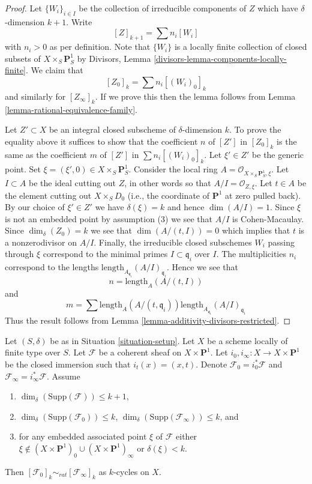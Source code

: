 \begin{proof}
Let $\{W_i\}_{i \in I}$ be the collection of irreducible
components of $Z$ which have $\delta$-dimension $k + 1$.
Write
$$
[Z]_{k + 1} = \sum n_i[W_i]
$$
with $n_i > 0$ as per definition. Note that $\{W_i\}$
is a locally finite collection of closed subsets of
$X \times_S \mathbf{P}^1_S$ by
Divisors, Lemma \ref{divisors-lemma-components-locally-finite}.
We claim that
$$
[Z_0]_k = \sum n_i[(W_i)_0]_k
$$
and similarly for $[Z_\infty]_k$. If we prove this then the lemma
follows from Lemma \ref{lemma-rational-equivalence-family}.

\medskip\noindent
Let $Z' \subset X$ be an integral closed subscheme of $\delta$-dimension $k$.
To prove the equality above it suffices to show that the coefficient $n$
of $[Z']$ in $[Z_0]_k$ is the same as the coefficient $m$ of
$[Z']$ in $\sum n_i[(W_i)_0]_k$. Let $\xi' \in Z'$ be the generic point.
Set $\xi = (\xi', 0) \in  X \times_S \mathbf{P}^1_S$.
Consider the local ring $A = \mathcal{O}_{X \times_S \mathbf{P}^1_S, \xi}$.
Let $I \subset A$ be the ideal cutting out $Z$, in other words so that
$A/I = \mathcal{O}_{Z, \xi}$. Let $t \in A$ be the element cutting
out $X \times_S D_0$ (i.e., the coordinate of $\mathbf{P}^1$ at zero
pulled back). By our choice of $\xi' \in Z'$ we have $\delta(\xi) = k$
and hence $\dim(A/I) = 1$. Since $\xi$ is not an embedded point by
assumption (3) we see that $A/I$ is Cohen-Macaulay. Since $\dim_\delta(Z_0)
= k$ we see that $\dim(A/(t, I)) = 0$ which implies that $t$
is a nonzerodivisor on $A/I$. Finally, the irreducible closed subschemes
$W_i$ passing through $\xi$ correspond to the minimal primes
$I \subset \mathfrak q_i$ over $I$. The multiplicities $n_i$ correspond
to the lengths $\text{length}_{A_{\mathfrak q_i}}(A/I)_{\mathfrak q_i}$.
Hence we see that
$$
n = \text{length}_A(A/(t, I))
$$
and
$$
m = \sum
\text{length}_A(A/(t, \mathfrak q_i))
\text{length}_{A_{\mathfrak q_i}}(A/I)_{\mathfrak q_i}
$$
Thus the result follows from
Lemma \ref{lemma-additivity-divisors-restricted}.
\end{proof}

\begin{lemma}
\label{lemma-coherent-sheaf-cross-p1}
Let $(S, \delta)$ be as in Situation \ref{situation-setup}.
Let $X$ be a scheme locally of finite type over $S$.
Let $\mathcal{F}$ be a coherent sheaf on $X \times \mathbf{P}^1$.
Let $i_0, i_\infty : X \to X \times \mathbf{P}^1$ be the closed immersion
such that $i_t(x) = (x, t)$. Denote $\mathcal{F}_0 = i_0^*\mathcal{F}$ and
$\mathcal{F}_\infty = i_\infty^*\mathcal{F}$.
Assume
\begin{enumerate}
\item $\dim_\delta(\text{Supp}(\mathcal{F})) \leq k + 1$,
\item $\dim_\delta(\text{Supp}(\mathcal{F}_0)) \leq k$,
$\dim_\delta(\text{Supp}(\mathcal{F}_\infty)) \leq k$, and
\item for any embedded associated point $\xi$ of $\mathcal{F}$ either
$\xi \not \in (X \times \mathbf{P}^1)_0 \cup (X \times \mathbf{P}^1)_\infty$
or $\delta(\xi) < k$.
\end{enumerate}
Then $[\mathcal{F}_0]_k \sim_{rat} [\mathcal{F}_\infty]_k$ as $k$-cycles on $X$.
\end{lemma}

